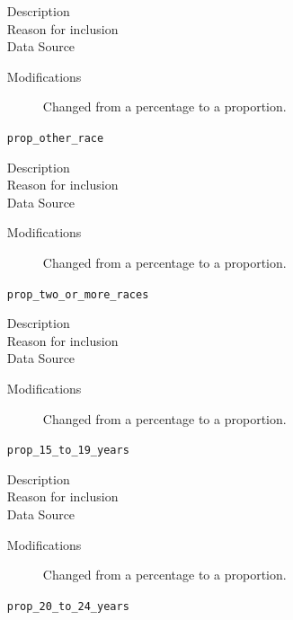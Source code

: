 \documentclass{article}
\begin{document}
\begin{itemize}[label={}, align=left]
          \begin{description}
              \item[Description] 
              \item[Reason for inclusion] \descentreason
              \item[Data Source] \cite{acs_demographics_data}
              \item[Modifications] Changed from a percentage to a proportion.
          \end{description}
    \item[\texttt{prop\_other\_race}] \
          \begin{description}
              \item[Description] 
              \item[Reason for inclusion] \descentreason
              \item[Data Source] \cite{acs_demographics_data}
              \item[Modifications] Changed from a percentage to a proportion.
          \end{description}
    \item[\texttt{prop\_two\_or\_more\_races}] \
          \begin{description}
              \item[Description] 
              \item[Reason for inclusion] \descentreason
              \item[Data Source] \cite{acs_demographics_data}
              \item[Modifications] Changed from a percentage to a proportion.
          \end{description}
    \item[\texttt{prop\_15\_to\_19\_years}] \
          \begin{description}
              \item[Description] 
              \item[Reason for inclusion] \agereason
              \item[Data Source] \cite{acs_demographics_data}
              \item[Modifications] Changed from a percentage to a proportion.
          \end{description}
    \item[\texttt{prop\_20\_to\_24\_years}] \
          \begin{description}

\end{description}
\end{itemize}
\end{document}
